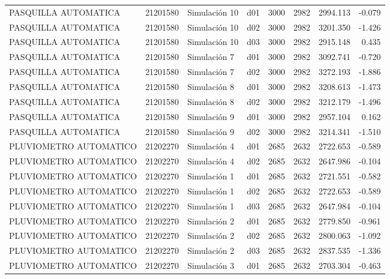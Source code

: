 \begin{landscape}
\begin{longtable}{lrlp{2cm}p{2cm}p{3cm}p{2cm}r}
    PASQUILLA AUTOMATICA &  21201580 &  Simulación 10 &   d01 &      3000 &     2982 &  2994.113 &    -0.079 \\
    PASQUILLA AUTOMATICA &  21201580 &  Simulación 10 &   d02 &      3000 &     2982 &  3201.350 &    -1.426 \\
    PASQUILLA AUTOMATICA &  21201580 &  Simulación 10 &   d03 &      3000 &     2982 &  2915.148 &     0.435 \\
    PASQUILLA AUTOMATICA &  21201580 &   Simulación 7 &   d01 &      3000 &     2982 &  3092.741 &    -0.720 \\
    PASQUILLA AUTOMATICA &  21201580 &   Simulación 7 &   d02 &      3000 &     2982 &  3272.193 &    -1.886 \\
    PASQUILLA AUTOMATICA &  21201580 &   Simulación 8 &   d01 &      3000 &     2982 &  3208.613 &    -1.473 \\
    PASQUILLA AUTOMATICA &  21201580 &   Simulación 8 &   d02 &      3000 &     2982 &  3212.179 &    -1.496 \\
    PASQUILLA AUTOMATICA &  21201580 &   Simulación 9 &   d01 &      3000 &     2982 &  2957.104 &     0.162 \\
    PASQUILLA AUTOMATICA &  21201580 &   Simulación 9 &   d02 &      3000 &     2982 &  3214.341 &    -1.510 \\
  PLUVIOMETRO AUTOMATICO &  21202270 &   Simulación 4 &   d01 &      2685 &     2632 &  2722.653 &    -0.589 \\
  PLUVIOMETRO AUTOMATICO &  21202270 &   Simulación 4 &   d02 &      2685 &     2632 &  2647.986 &    -0.104 \\
  PLUVIOMETRO AUTOMATICO &  21202270 &   Simulación 1 &   d01 &      2685 &     2632 &  2721.551 &    -0.582 \\
  PLUVIOMETRO AUTOMATICO &  21202270 &   Simulación 1 &   d02 &      2685 &     2632 &  2722.653 &    -0.589 \\
  PLUVIOMETRO AUTOMATICO &  21202270 &   Simulación 1 &   d03 &      2685 &     2632 &  2647.984 &    -0.104 \\
  PLUVIOMETRO AUTOMATICO &  21202270 &   Simulación 2 &   d01 &      2685 &     2632 &  2779.850 &    -0.961 \\
  PLUVIOMETRO AUTOMATICO &  21202270 &   Simulación 2 &   d02 &      2685 &     2632 &  2800.063 &    -1.092 \\
  PLUVIOMETRO AUTOMATICO &  21202270 &   Simulación 2 &   d03 &      2685 &     2632 &  2837.535 &    -1.336 \\
  PLUVIOMETRO AUTOMATICO &  21202270 &   Simulación 3 &   d01 &      2685 &     2632 &  2703.304 &    -0.463 \\

\end{longtable}
\end{landscape}
